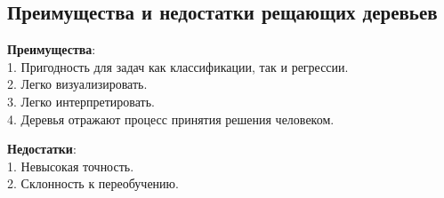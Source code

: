 \documentclass{article}
\begin{document}
\subsection{Преимущества и недостатки рещающих деревьев}

\textbf{Преимущества}:\\
1. Пригодность для задач как классификации, так и регрессии.\\
2. Легко визуализировать.\\
3. Легко интерпретировать.\\
4. Деревья отражают процесс принятия решения человеком.

\textbf{Недостатки}:\\
1. Невысокая точность.\\
2. Склонность к переобучению.
\end{document}

